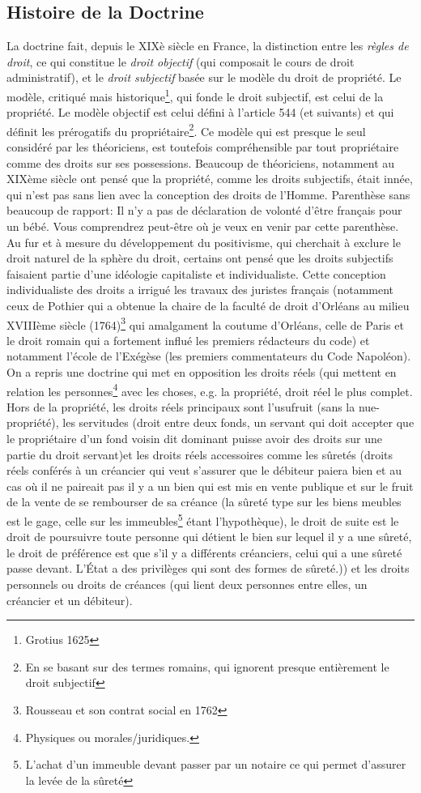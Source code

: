 \documentclass[math]{cours}
\begin{document}
\subsection{Histoire de la Doctrine}
La doctrine fait, depuis le XIXè siècle en France, la distinction entre les \emph{règles de droit}, ce qui constitue le \emph{droit objectif} (qui composait le cours de droit administratif), et le \emph{droit subjectif} basée sur le modèle du droit de propriété.
Le modèle, critiqué mais historique\footnote{Grotius 1625}, qui fonde le droit subjectif, est celui de la propriété. Le modèle objectif est celui défini à l'article 544 (et suivants) et qui définit les prérogatifs du propriétaire\footnote{En se basant sur des termes romains, qui ignorent presque entièrement le droit subjectif}.
Ce modèle qui est presque le seul considéré par les théoriciens, est toutefois compréhensible par tout propriétaire comme des droits sur ses possessions.
Beaucoup de théoriciens, notamment au XIXème siècle ont pensé que la propriété, comme les droits subjectifs, était innée, qui n'est pas sans lien avec la conception des droits de l'Homme.
Parenthèse sans beaucoup de rapport: Il n'y a pas de déclaration de volonté d'être français pour un bébé. \og Vous comprendrez peut-être où je veux en venir par cette parenthèse\fg.
Au fur et à mesure du développement du positivisme, qui cherchait à exclure le droit naturel de la sphère du droit, certains ont pensé que les droits subjectifs faisaient partie d'une idéologie capitaliste et individualiste.
Cette conception individualiste des droits a irrigué les travaux des juristes français (notamment ceux de Pothier qui a obtenue la chaire de la faculté de droit d'Orléans au milieu XVIIIème siècle (1764)\footnote{Rousseau et son contrat social en 1762} qui amalgament la coutume d'Orléans, celle de Paris et le droit romain qui a fortement influé les premiers rédacteurs du code) et notamment l'école de l'Exégèse (les premiers commentateurs du Code Napoléon).
On a repris une doctrine qui met en opposition les droits réels (qui mettent en relation les personnes\footnote{Physiques ou morales/juridiques.} avec les choses, e.g. la propriété, droit réel le plus complet. Hors de la propriété, les droits réels principaux sont l'usufruit (sans la nue-propriété), les servitudes (droit entre deux fonds, un servant qui doit accepter que le propriétaire d'un fond voisin dit dominant puisse avoir des droits sur une partie du droit servant)et les droits réels accessoires comme les sûretés (droits réels conférés à un créancier qui veut s'assurer que le débiteur paiera bien et au cas où il ne paireait pas il y a un bien qui est mis en vente publique et sur le fruit de la vente de se rembourser de sa créance (la sûreté type sur les biens meubles est le gage, celle sur les immeubles\footnote{L'achat d'un immeuble devant passer par un notaire ce qui permet d'assurer la levée de la sûreté} étant l'hypothèque), le droit de suite est le droit de poursuivre toute personne qui détient le bien sur lequel il y a une sûreté, le droit de préférence est que s'il y a différents créanciers, celui qui a une sûreté passe devant. L'État a des privilèges qui sont des formes de sûreté.)) et les droits personnels ou droits de créances (qui lient deux personnes entre elles, un créancier et un débiteur).
\end{document}
